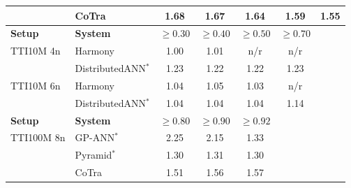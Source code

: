 \begin{table}[t]
\begin{tabular}{llcccc}
 & CoTra & 1.68 & 1.67 & 1.64 & 1.59 & 1.55 \\
\midrule
\textbf{Setup} & \textbf{System} & $\geq 0.30$ & $\geq 0.40$ & $\geq 0.50$ & $\geq 0.70$ \\
\midrule
TTI10M 4n & Harmony & 1.00 & 1.01 & n/r & n/r \\
 & DistributedANN$^*$ & 1.23 & 1.22 & 1.22 & 1.23 \\
\addlinespace
TTI10M 6n & Harmony & 1.04 & 1.05 & 1.03 & n/r \\
 & DistributedANN$^*$ & 1.04 & 1.04 & 1.04 & 1.14 \\
\midrule
\textbf{Setup} & \textbf{System} & $\geq 0.80$ & $\geq 0.90$ & $\geq 0.92$ &  \\
\midrule
TTI100M 8n & GP-ANN$^*$ & 2.25 & 2.15 & 1.33 &  \\
 & Pyramid$^*$ & 1.30 & 1.31 & 1.30 &  \\
 & CoTra & 1.51 & 1.56 & 1.57 &  \\
\bottomrule
\end{tabular}
\end{table}

